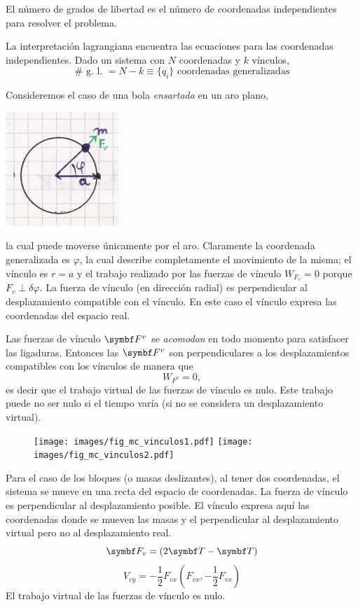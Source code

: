 \documentclass[10pt,oneside]{CBFT_book}
\begin{document}
El número de grados de libertad es el número de coordenadas independientes para resolver el problema.

La interpretación lagrangiana encuentra las ecuaciones para las coordenadas independientes.
Dado un sistema con $N$ coordenadas y $k$ vínculos,
\[
	\# \text{ g. l. } = N - k \equiv \{ q_i \} \text{ coordenadas generalizadas}
\]

Consideremos el caso de una bola {\it ensartada} en un aro plano,

\includegraphics[scale=0.35]{images/fig_mc_bola_ensartada.jpg}

la cual puede moverse únicamente por el aro. Claramente la coordenada generalizada es $\varphi$, la cual
describe completamente el movimiento de la misma; el vínculo es $ r = a $ y el trabajo realizado por las
fuerzas de vínculo $W_{F_v} = 0 $ porque $F_v \perp \delta \varphi$. La fuerza de vínculo (en dirección radial)
es perpendicular al desplazamiento compatible con el vínculo.
En este caso el vínculo expresa las coordenadas del espacio real.

Las fuerzas de vínculo $\vb{F}^v$ se {\it acomodan} en todo momento para satisfacer las ligaduras.
Entonces las $\vb{F}^v$ son perpendiculares a los desplazamientos compatibles con los vínculos de
manera que 
\[
	W_{F^v} = 0,
\]
es decir que el trabajo virtual de las fuerzas de vínculo es nulo. Este trabajo puede no ser nulo si el tiempo 
varía (si no se considera un desplazamiento virtual).

\begin{figure}[hbt]
	\begin{center}
	\texttt{[image: images/fig\_mc\_vinculos1.pdf]}	 
	\texttt{[image: images/fig\_mc\_vinculos2.pdf]}
	\end{center}
	\caption{}
\end{figure} 


Para el caso de los bloques (o masas deslizantes), al tener dos coordenadas, el sistema se mueve en una recta del espacio 
de coordenadas.
La fuerza de vínculo es perpendicular al desplazamiento posible.
El vínculo expresa aquí las coordenadas donde se mueven las masas y el perpendicular al desplazamiento virtual pero no al
desplazamiento real.
\[
	\vb{F}_v = (2\vb{T}-\vb{T})
\]
\[
	V_{vy} = - \frac 1 2 F_{vx} (F_{vx},-\frac 1 2 F_{vx})
\]
El trabajo virtual de las fuerzas de vínculo es nulo.
\end{document}
